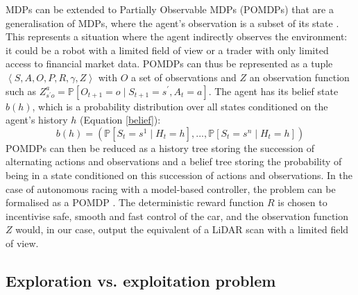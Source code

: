 MDPs can be extended to Partially Observable MDPs (POMDPs) that are a generalisation of MDPs, where the agent's observation is a subset of its state \cite{silver2015}. This represents a situation where the agent indirectly observes the environment: it could be a robot with a limited field of view or a trader with only limited access to financial market data. POMDPs can thus be represented as a tuple $\left< S,A,O,P,R,\gamma,Z \right>$ with $O$ a set of observations and $Z$ an observation function such as $Z_{s^{'}o}^{a} = \mathbb{P}[O_{t+1}=o \mid S_{t+1} = s^{'},A_t = a]$. The agent has its belief state $b(h)$, which is a probability distribution over all states conditioned on the agent's history $h$ (Equation \ref{belief}):
\begin{equation}
\label{belief}
b(h) = (\mathbb{P}[S_t = s^{1} \mid H_t = h ],...,\mathbb{P}[S_t = s^{n} \mid H_t = h])
\end{equation}
POMDPs can then be reduced as a history tree storing the succession of alternating actions and observations and a belief tree storing the probability of being in a state conditioned on this succession of actions and observations. \newline
In the case of autonomous racing with a model-based controller, the problem can be formalised as a POMDP \cite{modelbased}. The deterministic reward function $R$ is chosen to incentivise safe, smooth and fast control of the car, and the observation function $Z$ would, in our case, output the equivalent of a LiDAR scan with a limited field of view.


\subsection{Exploration vs. exploitation problem}
\label{explovsexplo}

